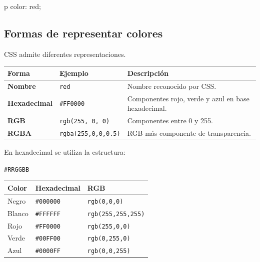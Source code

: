 \documentclass[11pt]{article}
\begin{document}
    \begin{csscodedark}
        p {
            color: red;
        }
    \end{csscodedark}

    \subsection{Formas de representar colores}

    CSS admite diferentes representaciones.

    \begin{center}
        \begin{tabularx}{0.92\textwidth}{>{\bfseries}p{3cm}p{4cm}X}
            \toprule
            Forma & Ejemplo & Descripción \\
            \midrule
            Nombre & \texttt{red} & Nombre reconocido por CSS. \\
            Hexadecimal & \texttt{\#FF0000} & Componentes rojo, verde y azul en base hexadecimal. \\
            RGB & \texttt{rgb(255, 0, 0)} & Componentes entre 0 y 255. \\
            RGBA & \texttt{rgba(255,0,0,0.5)} & RGB más componente de transparencia. \\
            \bottomrule
        \end{tabularx}
    \end{center}

    En hexadecimal se utiliza la estructura:

    \begin{center}
        \texttt{\#RRGGBB}
    \end{center}

    \begin{center}
        \begin{tabular}{lll}
            \toprule
            Color & Hexadecimal & RGB \\
            \midrule
            Negro & \texttt{\#000000} & \texttt{rgb(0,0,0)} \\
            Blanco & \texttt{\#FFFFFF} & \texttt{rgb(255,255,255)} \\
            Rojo & \texttt{\#FF0000} & \texttt{rgb(255,0,0)} \\
            Verde & \texttt{\#00FF00} & \texttt{rgb(0,255,0)} \\
            Azul & \texttt{\#0000FF} & \texttt{rgb(0,0,255)} \\
            \bottomrule
        \end{tabular}
    \end{center}
\end{document}
